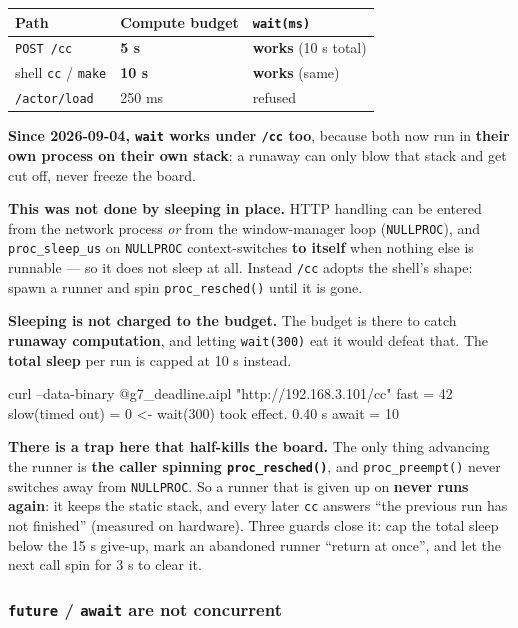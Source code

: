 \documentclass[11pt,a4paper]{article}
\begin{document}
\begin{center}
\small
\begin{tabular}{@{}lll@{}}
\toprule
Path & Compute budget & \texttt{wait(ms)} \\
\midrule
\texttt{POST /cc} & \textbf{5 s} & \textbf{works} (10 s total) \\
shell \texttt{cc} / \texttt{make} & \textbf{10 s} & \textbf{works} (same) \\
\texttt{/actor/load} & 250 ms & refused \\
\bottomrule
\end{tabular}
\end{center}

\textbf{Since 2026-09-04, \texttt{wait} works under \texttt{/cc} too}, because both
now run in \textbf{their own process on their own stack}: a runaway can only blow
that stack and get cut off, never freeze the board.

\textbf{This was not done by sleeping in place.} HTTP handling can be entered from
the network process \emph{or} from the window-manager loop (\texttt{NULLPROC}), and
\texttt{proc\_sleep\_us} on \texttt{NULLPROC} context-switches \textbf{to itself} when
nothing else is runnable --- so it does not sleep at all. Instead \texttt{/cc} adopts
the shell's shape: spawn a runner and spin \texttt{proc\_resched()} until it is gone.

\textbf{Sleeping is not charged to the budget.} The budget is there to catch
\textbf{runaway computation}, and letting \texttt{wait(300)} eat it would defeat that.
The \textbf{total sleep} per run is capped at 10 s instead.

\begin{term}
curl --data-binary @g7_deadline.aipl "http://192.168.3.101/cc"
  fast = 42
  slow(timed out) = 0        <- wait(300) took effect. 0.40 s
  await = 10
\end{term}

\textbf{There is a trap here that half-kills the board.} The only thing advancing
the runner is \textbf{the caller spinning \texttt{proc\_resched()}}, and
\texttt{proc\_preempt()} never switches away from \texttt{NULLPROC}. So a runner that
is given up on \textbf{never runs again}: it keeps the static stack, and every later
\texttt{cc} answers ``the previous run has not finished'' (measured on hardware).
Three guards close it: cap the total sleep below the 15 s give-up, mark an
abandoned runner ``return at once'', and let the next call spin for 3 s to clear it.

\subsubsection*{\texttt{future} / \texttt{await} are not concurrent}
\label{sec:pi5-future}
\end{document}
